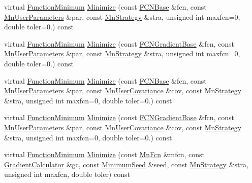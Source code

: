 \begin{DoxyCompactItemize}
\item 
virtual \mbox{\hyperlink{classROOT_1_1Minuit2_1_1FunctionMinimum}{Function\+Minimum}} \mbox{\hyperlink{classROOT_1_1Minuit2_1_1FumiliMinimizer_a22c4059fb94d5e40c843ac90440d2975}{Minimize}} (const \mbox{\hyperlink{classROOT_1_1Minuit2_1_1FCNBase}{F\+C\+N\+Base}} \&fcn, const \mbox{\hyperlink{classROOT_1_1Minuit2_1_1MnUserParameters}{Mn\+User\+Parameters}} \&par, const \mbox{\hyperlink{classROOT_1_1Minuit2_1_1MnStrategy}{Mn\+Strategy}} \&stra, unsigned int maxfcn=0, double toler=0.) const
\item 
virtual \mbox{\hyperlink{classROOT_1_1Minuit2_1_1FunctionMinimum}{Function\+Minimum}} \mbox{\hyperlink{classROOT_1_1Minuit2_1_1FumiliMinimizer_a2b14890a2b40ae8db356b71be505ce66}{Minimize}} (const \mbox{\hyperlink{classROOT_1_1Minuit2_1_1FCNGradientBase}{F\+C\+N\+Gradient\+Base}} \&fcn, const \mbox{\hyperlink{classROOT_1_1Minuit2_1_1MnUserParameters}{Mn\+User\+Parameters}} \&par, const \mbox{\hyperlink{classROOT_1_1Minuit2_1_1MnStrategy}{Mn\+Strategy}} \&stra, unsigned int maxfcn=0, double toler=0.) const
\item 
virtual \mbox{\hyperlink{classROOT_1_1Minuit2_1_1FunctionMinimum}{Function\+Minimum}} \mbox{\hyperlink{classROOT_1_1Minuit2_1_1FumiliMinimizer_a954728eb57315bb43039fe2ba71f4098}{Minimize}} (const \mbox{\hyperlink{classROOT_1_1Minuit2_1_1FCNBase}{F\+C\+N\+Base}} \&fcn, const \mbox{\hyperlink{classROOT_1_1Minuit2_1_1MnUserParameters}{Mn\+User\+Parameters}} \&par, const \mbox{\hyperlink{classROOT_1_1Minuit2_1_1MnUserCovariance}{Mn\+User\+Covariance}} \&cov, const \mbox{\hyperlink{classROOT_1_1Minuit2_1_1MnStrategy}{Mn\+Strategy}} \&stra, unsigned int maxfcn=0, double toler=0.) const
\item 
virtual \mbox{\hyperlink{classROOT_1_1Minuit2_1_1FunctionMinimum}{Function\+Minimum}} \mbox{\hyperlink{classROOT_1_1Minuit2_1_1FumiliMinimizer_adb2739d40e10cce1923e5a21dac3f420}{Minimize}} (const \mbox{\hyperlink{classROOT_1_1Minuit2_1_1FCNGradientBase}{F\+C\+N\+Gradient\+Base}} \&fcn, const \mbox{\hyperlink{classROOT_1_1Minuit2_1_1MnUserParameters}{Mn\+User\+Parameters}} \&par, const \mbox{\hyperlink{classROOT_1_1Minuit2_1_1MnUserCovariance}{Mn\+User\+Covariance}} \&cov, const \mbox{\hyperlink{classROOT_1_1Minuit2_1_1MnStrategy}{Mn\+Strategy}} \&stra, unsigned int maxfcn=0, double toler=0.) const
\item 
virtual \mbox{\hyperlink{classROOT_1_1Minuit2_1_1FunctionMinimum}{Function\+Minimum}} \mbox{\hyperlink{classROOT_1_1Minuit2_1_1FumiliMinimizer_ace396e586a17ad934f18b32c8ddd054a}{Minimize}} (const \mbox{\hyperlink{classROOT_1_1Minuit2_1_1MnFcn}{Mn\+Fcn}} \&mfcn, const \mbox{\hyperlink{classROOT_1_1Minuit2_1_1GradientCalculator}{Gradient\+Calculator}} \&gc, const \mbox{\hyperlink{classROOT_1_1Minuit2_1_1MinimumSeed}{Minimum\+Seed}} \&seed, const \mbox{\hyperlink{classROOT_1_1Minuit2_1_1MnStrategy}{Mn\+Strategy}} \&stra, unsigned int maxfcn, double toler) const

\end{DoxyCompactItemize}
